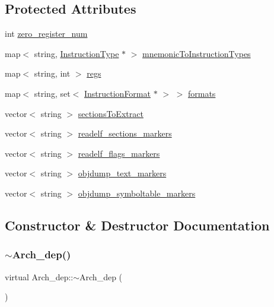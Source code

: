 \subsection*{Protected Attributes}
\begin{DoxyCompactItemize}
\item 
int \hyperlink{classArch__dep_aef2b07cdb458eeabf49511678238d91c}{zero\+\_\+register\+\_\+num}
\item 
map$<$ string, \hyperlink{classInstructionType}{Instruction\+Type} $\ast$ $>$ \hyperlink{classArch__dep_a21dc91a47a70b553207b199458784f77}{mnemonic\+To\+Instruction\+Types}
\item 
map$<$ string, int $>$ \hyperlink{classArch__dep_adca30c5e86132ee9d152638d6db513bb}{regs}
\item 
map$<$ string, set$<$ \hyperlink{classInstructionFormat}{Instruction\+Format} $\ast$ $>$ $>$ \hyperlink{classArch__dep_aeeeb564f05fb3d397d87f2869663ad2e}{formats}
\item 
vector$<$ string $>$ \hyperlink{classArch__dep_aa92e4e668b37f15cabfca78f2ee4406a}{sections\+To\+Extract}
\item 
vector$<$ string $>$ \hyperlink{classArch__dep_a5be691cc406884dde58bcb792268cf4a}{readelf\+\_\+sections\+\_\+markers}
\item 
vector$<$ string $>$ \hyperlink{classArch__dep_a3c4bd1d73aa96100fcefbba1219ca9ba}{readelf\+\_\+flags\+\_\+markers}
\item 
vector$<$ string $>$ \hyperlink{classArch__dep_a142338c3f4ce8a5f312d436b395a9e44}{objdump\+\_\+text\+\_\+markers}
\item 
vector$<$ string $>$ \hyperlink{classArch__dep_a60ff2387eef16e09dceefea48a0da8ab}{objdump\+\_\+symboltable\+\_\+markers}
\end{DoxyCompactItemize}


\subsection{Constructor \& Destructor Documentation}
\mbox{\label{classArch__dep_ace6563eaed5469d5c65d1373dbf6e1cd}} 
\subsubsection{\texorpdfstring{$\sim$\+Arch\+\_\+dep()}{~Arch\_dep()}}
{\footnotesize\ttfamily virtual Arch\+\_\+dep\+::$\sim$\+Arch\+\_\+dep (\begin{DoxyParamCaption}{ }\end{DoxyParamCaption})\hspace{0.3cm}{\ttfamily [virtual]}}



